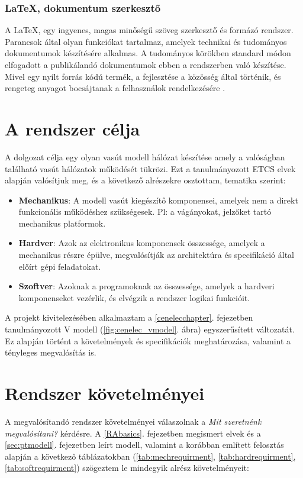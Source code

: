 \documentclass[a4paper,12pt]{article}
\begin{document}
\subsubsection{\LaTeX,  dokumentum szerkesztő}
A \LaTeX, egy ingyenes, magas minőségű szöveg szerkesztő és formázó rendszer.
Parancsok által olyan funkciókat tartalmaz, amelyek technikai és tudományos dokumentumok készítésére alkalmas.
A tudományos körökben standard módon elfogadott a publikálandó dokumentumok ebben a rendszerben való készítése.
Mivel egy nyílt forrás kódú termék, a fejlesztése a közösség által történik, és rengeteg anyagot bocsájtanak a felhasználok rendelkezésére \cite{latpro19}.

\newpage
\section{A rendszer célja}
A dolgozat célja egy olyan vasút modell hálózat készítése amely a valóságban található vasút hálózatok működését tükrözi.
Ezt a tanulmányozott ETCS elvek alapján valósítjuk meg, és a következő  alrészekre osztottam, tematika szerint:
\begin{itemize}
	\item \textbf{Mechanikus}: A modell vasút kiegészítő komponensei, amelyek nem a direkt funkcionális működéshez szükségesek. Pl: a vágányokat, jelzőket tartó mechanikus platformok.
	\item \textbf{Hardver}: Azok az elektronikus komponensek összessége, amelyek a mechanikus részre épülve, megvalósítják az architektúra és specifikáció által előírt gépi feladatokat.
	\item \textbf{Szoftver}: Azoknak a programoknak az összessége, amelyek a hardveri komponenseket vezérlik, és elvégzik a rendszer logikai funkcióit.
\end{itemize}

A projekt kivitelezésében alkalmaztam a \ref{cenelecchapter}. fejezetben tanulmányozott V modell (\ref{fig:cenelec_vmodel}. ábra) egyszerűsített változatát. 
Ez alapján történt a követelmények és specifikációk meghatározása, valamint a tényleges megvalósítás is. 
\section{Rendszer követelményei}
A megvalósítandó rendszer követelményei válaszolnak a \textit{Mit szeretnénk megvalósítani?} kérdésre. A \ref{RAbasics}. fejezetben megismert elvek és a \ref{sec:ptmodell}. fejezetben leírt modell, valamint a korábban említett felosztás alapján a következő táblázatokban (\ref{tab:mechrequirment}, \ref{tab:hardrequirment}, \ref{tab:softrequirment}) szögeztem le mindegyik alrész követelményeit:
\end{document}
